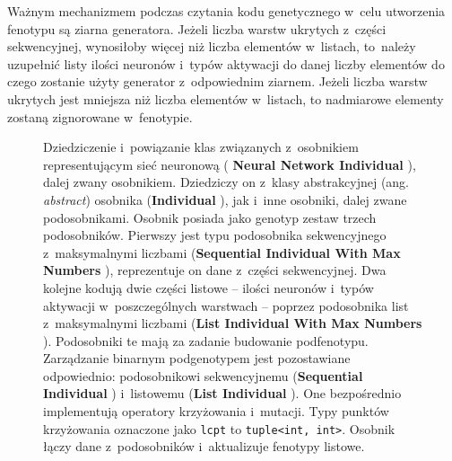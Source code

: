 Ważnym mechanizmem podczas czytania kodu genetycznego
w~celu utworzenia fenotypu są ziarna generatora.
Jeżeli liczba warstw ukrytych z~części sekwencyjnej,
wynosiłoby więcej niż liczba elementów w~listach,
to~należy uzupełnić listy ilości neuronów
i~typów aktywacji do danej liczby elementów
do czego zostanie użyty generator z~odpowiednim ziarnem.
Jeżeli liczba warstw ukrytych jest
mniejsza niż liczba elementów w~listach,
to nadmiarowe elementy zostaną zignorowane w~fenotypie.

\begin{figure}
  \centering
  \resizebox{\textwidth}{!}{%
  }
  {%
    \renewcommand{\thesubfigure}{I}%
    \label{subfig:gen_parts_I}%
    \renewcommand{\thesubfigure}{SI}%
    \label{subfig:gen_parts_SI}%
    \renewcommand{\thesubfigure}{LI}%
    \label{subfig:gen_parts_LI}%
    \renewcommand{\thesubfigure}{MNSI}%
    \label{subfig:gen_parts_MNSI}%
    \renewcommand{\thesubfigure}{MNLI}%
    \label{subfig:gen_parts_MNLI}%
    \renewcommand{\thesubfigure}{NNI}%
    \label{subfig:gen_parts_NNI}%
  }%
  \caption{
    Dziedziczenie i~powiązanie klas związanych
    z~osobnikiem representującym sieć neuronową (%
    \textbf{Neural Network Individual}
    \textbf{}%
    ), dalej zwany osobnikiem.
    Dziedziczy on z~klasy abstrakcyjnej
    (ang. \textit{abstract}) osobnika (\textbf{Individual}
    \textbf{}),
    jak i~inne osobniki, dalej zwane podosobnikami.
    Osobnik posiada jako genotyp
    zestaw trzech podosobników.
    Pierwszy jest typu podosobnika
    sekwencyjnego z~maksymalnymi liczbami
    (\textbf{Sequential Individual With Max Numbers}
    \textbf{}),
    reprezentuje on dane z~części sekwencyjnej.
    Dwa kolejne kodują dwie części listowe
    -- ilości neuronów i~typów aktywacji
    w~poszczególnych warstwach
    -- poprzez podosobnika list
    z~maksymalnymi liczbami
    (\textbf{List Individual With Max Numbers}
    \textbf{}).
    Podosobniki te mają za zadanie budowanie podfenotypu.
    Zarządzanie binarnym podgenotypem
    jest pozostawiane odpowiednio:
    podosobnikowi sekwencyjnemu
    (\textbf{Sequential Individual}
    \textbf{})
    i~listowemu (\textbf{List Individual}
    \textbf{}).
    One bezpośrednio implementują
    operatory krzyżowania i~mutacji.
    Typy punktów krzyżowania
    oznaczone jako \texttt{lcpt} to
    \texttt{tuple{\textless}int, int{\textgreater}}.
    Osobnik łączy dane z~podosobników
    i~aktualizuje fenotypy listowe.
  }
  \label{fig:gen_parts}
\end{figure}

